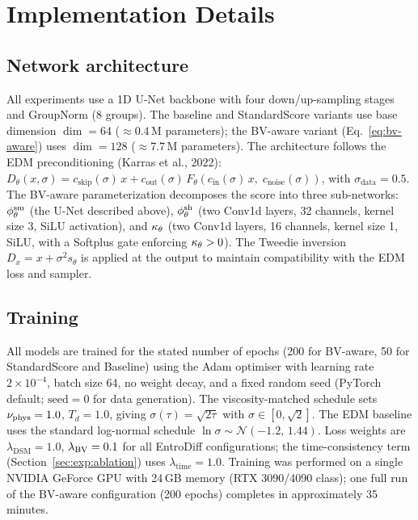 \section{Implementation Details}
\label{appx:impl}

\subsection{Network architecture}
\label{appx:impl:arch}

All experiments use a 1D U-Net backbone with four down/up-sampling stages and
GroupNorm (8 groups). The baseline and StandardScore variants use base
dimension $\dim=64$ ($\approx 0.4$\,M parameters); the BV-aware variant
(Eq.~\ref{eq:bv-aware}) uses $\dim=128$ ($\approx 7.7$\,M parameters). The
architecture follows the {EDM} preconditioning (Karras et al., 2022):
$D_{\theta}(x,\sigma) = c_{\mathrm{skip}}(\sigma)\,x + c_{\mathrm{out}}(\sigma)\,F_{\theta}(c_{\mathrm{in}}(\sigma)\,x,\;c_{\mathrm{noise}}(\sigma))$,
with $\sigma_{\mathrm{data}}=0.5$. The BV-aware parameterization decomposes
the score into three sub-networks: $\phi^{\mathrm{sm}}_{\theta}$ (the U-Net described above),
$\phi^{\mathrm{sh}}_{\theta}$ (two Conv1d layers, 32 channels, kernel size 3, SiLU activation),
and $\kappa_{\theta}$ (two Conv1d layers, 16 channels, kernel size 1, SiLU, with a
Softplus gate enforcing $\kappa_{\theta}>0$). The Tweedie inversion
$D_{x} = x + \sigma^{2}s_{\theta}$ is applied at the output to maintain
compatibility with the EDM loss and sampler.

\subsection{Training}
\label{appx:impl:train}

All models are trained for the stated number of epochs (200 for BV-aware,
50 for StandardScore and Baseline) using the Adam optimiser with learning
rate $2\times10^{-4}$, batch size 64, no weight decay, and a fixed random
seed (PyTorch default; $\mathrm{seed}=0$ for data generation). The
viscosity-matched schedule sets $\nu_{\mathrm{phys}}=1.0$, $T_{d}=1.0$, giving
$\sigma(\tau) = \sqrt{2\tau}$ with $\sigma\in[0,\sqrt{2}]$. The EDM baseline
uses the standard log-normal schedule $\ln\sigma\sim\mathcal{N}(-1.2,\,1.44)$.
Loss weights are $\lambda_{\mathrm{DSM}}=1.0$, $\lambda_{\mathrm{BV}}=0.1$ for all
EntroDiff configurations; the time-consistency term (Section~\ref{sec:exp:ablation})
uses $\lambda_{\mathrm{time}}=1.0$. Training was performed on a single NVIDIA
GeForce GPU with 24\,GB memory (RTX 3090/4090 class); one full run of the
BV-aware configuration (200 epochs) completes in approximately 35 minutes.

